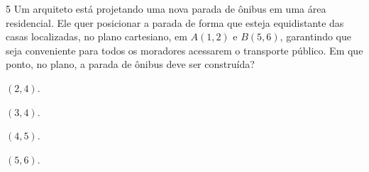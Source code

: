 

\num{5} Um arquiteto está projetando uma nova parada de ônibus em uma
área residencial. Ele quer posicionar a parada de forma que esteja
equidistante das casas localizadas, no plano cartesiano, em $A(1, 2)$ e
$B(5, 6)$, garantindo que seja conveniente para todos os moradores
acessarem o transporte público. Em que ponto, no plano, a parada de
ônibus deve ser construída?

\begin{escolha}
\item $(2, 4)$.

\item $(3, 4)$.

\item $(4, 5)$.

\item $(5, 6)$.
\end{escolha}



